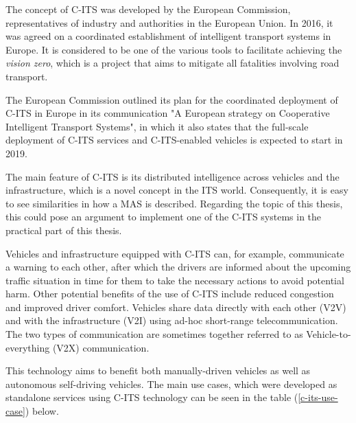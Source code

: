 \documentclass[main.tex]{subfiles}
\begin{document}
The concept of C-ITS was developed by the European Commission, representatives of industry and 
authorities in the European Union. In 2016, it was agreed on a coordinated establishment of intelligent
transport systems in Europe. It is considered to be one of the various tools to facilitate achieving 
the \emph{vision zero}, which is a project that aims to mitigate all fatalities involving road 
transport.

The European Commission outlined its plan for the coordinated deployment of C-ITS in Europe in
its communication "A European strategy on Cooperative Intelligent Transport Systems", in which
it also states that the full-scale deployment of C-ITS services and C-ITS-enabled vehicles is
expected to start in 2019.

The main feature of C-ITS is its distributed intelligence across vehicles and the infrastructure, 
which is a novel concept in the ITS world. Consequently, it is easy to see similarities in how a
MAS is described. Regarding the topic of this thesis, this could pose an argument to
implement one of the C-ITS systems in the practical part of this thesis.

Vehicles and infrastructure equipped with C-ITS can, for example, communicate a warning to each
other, after which the drivers are informed about the upcoming traffic situation in time for
them to take the necessary actions to avoid potential harm. Other potential benefits
of the use of C-ITS include reduced congestion and improved driver comfort. Vehicles 
share data directly with each other (V2V) and with the infrastructure (V2I) using ad-hoc
short-range telecommunication. The two types of communication are sometimes together referred 
to as Vehicle-to-everything (V2X) communication.

This technology aims to benefit both manually-driven vehicles 
as well as autonomous self-driving vehicles. The main use cases, which were developed as
standalone services using C-ITS technology can be seen in the table (\ref{c-its-use-case})
below.
\end{document}

